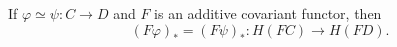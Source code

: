 If $\varphi \simeq \psi : C \to D$ and $F$ is an additive covariant functor, then
$$(F\varphi)_* = (F\psi)_* : H(FC) \to H(FD).$$